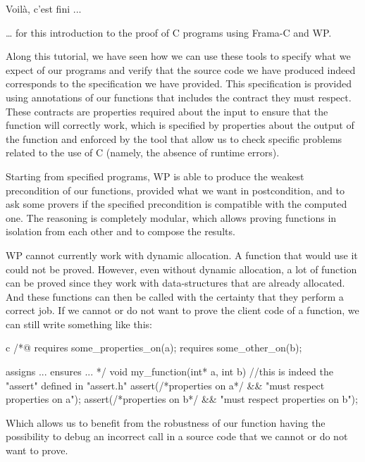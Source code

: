 \begin{Quotation}
Voilà, c'est fini ...
\end{Quotation}



\ldots{} for this introduction to the proof of C programs using Frama-C
and WP.

Along this tutorial, we have seen how we can use these tools to specify
what we expect of our programs and verify that the source code we have
produced indeed corresponds to the specification we have provided. This
specification is provided using annotations of our functions that
includes the contract they must respect. These contracts are properties
required about the input to ensure that the function will correctly
work, which is specified by properties about the output of the function
and enforced by the tool that allow us to check specific problems related
to the use of C (namely, the absence of runtime errors).

Starting from specified programs, WP is able to produce the weakest
precondition of our functions, provided what we want in postcondition,
and to ask some provers if the specified precondition is compatible with
the computed one. The reasoning is completely modular, which allows
proving functions in isolation from each other and to compose the results.


WP cannot currently work with dynamic allocation. A function that would use it
could not be proved. However, even without dynamic allocation, a lot of function
can be proved since they work with data-structures that are already allocated.
And these functions can then be called with the certainty that they
perform a correct job. If we cannot or do not want to prove the client code of a
function, we can still write something like this:



\begin{CodeBlock}{c}
/*@
  requires some_properties_on(a);
  requires some_other_on(b);

  assigns ...
  ensures ...
*/
void my_function(int* a, int b){
  //this is indeed the  "assert" defined in "assert.h"
  assert(/*properties on a*/ && "must respect properties on a");
  assert(/*properties on b*/ && "must respect properties on b");
}
\end{CodeBlock}



Which allows us to benefit from the robustness of our function having
the possibility to debug an incorrect call in a source code that we
cannot or do not want to prove.


